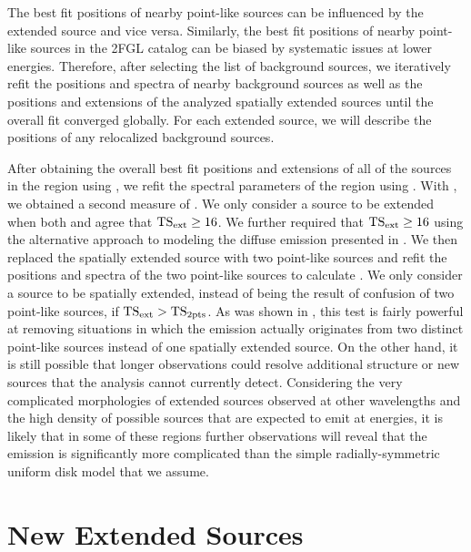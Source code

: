 The best fit positions of nearby point-like sources can be influenced by
the extended source and vice versa.  Similarly,
the best fit positions of nearby point-like sources in the 2FGL catalog can be biased
by systematic issues at lower energies.
Therefore, after selecting the list of background sources, we iteratively
refit the positions and spectra of nearby background sources as well as
the positions and extensions of the analyzed spatially extended
sources until the overall fit converged globally.  For each extended
source, we will describe the positions of any relocalized background
sources.

After obtaining the overall best fit positions and extensions of all
of the sources in the region using \pointlike, we refit the spectral
parameters of the region using \gtlike.  With \gtlike, we obtained a
second measure of \tsext.  We only consider a source to be extended when
both \pointlike and \gtlike agree that $\mathrm{TS}_\mathrm{ext}\ge16$. 
We further required that $\mathrm{TS}_\mathrm{ext}\ge16$ using the 
alternative approach to modeling the diffuse emission
presented in .
We then replaced the spatially extended source with two point-like
sources and refit the positions and spectra of the
two point-like sources to calculate \tsinc.
We only consider a source to be spatially extended, instead of being
the result of confusion of two point-like sources, if $\mathrm{TS}_\mathrm{ext}>\mathrm{TS}_{\mathrm{2pts}}$.
As was shown in , this test is
fairly powerful at removing situations in which the emission actually
originates from two distinct point-like sources instead of one spatially
extended source.  On the other hand, it is still possible that longer
observations could resolve additional structure or new sources 
that the analysis cannot currently detect. 
Considering the very complicated morphologies
of extended sources observed at other wavelengths and the high density
of possible sources that are expected to emit at \gev energies, it is
likely that in some of these regions further observations will reveal
that the emission is significantly more complicated than the simple
radially-symmetric uniform disk model that we assume.



\section{New Extended Sources}




